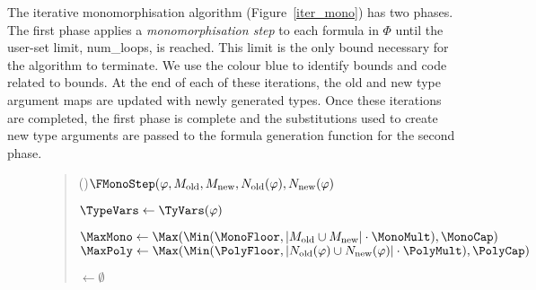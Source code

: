 \documentclass[]{ceurart}
\begin{document}
The iterative monomorphisation algorithm (Figure~\ref{iter_mono}) has two phases. The first phase applies a \emph{monomorphisation step} to each formula in \(\Phi\) until the user-set limit, \textcolor{ourblueviolet}{num\_loops}, is reached. This limit is the only bound necessary for the algorithm to terminate. We use the colour blue to identify bounds and code related to bounds. At the end of each of these iterations, the old and new type argument maps are updated with newly generated types. Once these iterations are completed, the first phase is complete and the substitutions used to create new type arguments are passed to the formula generation function for the second phase.


\begin{figure}
\begin{quote}
\begin{algorithm}[H]

   \Fn(){\(\FMonoStep(\varphi, M_{\text{old}}, M_{\text{new}}, N_{\text{old}}(\varphi), N_{\text{new}}(\varphi)\)}{

   \BlankLine

   \(\TypeVars \leftarrow \TyVars(\varphi)\)\;

   \textcolor{ourblueviolet}{
   \(\MaxMono \leftarrow \Max(\Min(\MonoFloor, |M_{\text{old}}\cup M_{\text{new}}| \cdot \MonoMult), \MonoCap)\)\;
   \(\MaxPoly \leftarrow \Max(\Min(\PolyFloor, |N_{\text{old}}(\varphi)\cup N_{\text{new}}(\varphi)| \cdot \PolyMult), \PolyCap)\)\;
   }

   \BlankLine

   \UsedSubst \(\leftarrow\emptyset\)\;

   \BlankLine

}
\end{algorithm}
\end{quote}
\end{figure}
\end{document}
